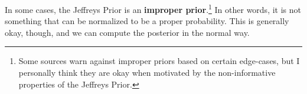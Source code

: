 \documentclass{tufte-handout}
\begin{document}
In some cases, the Jeffreys Prior is an \textbf{improper prior}.\footnote{
  Some sources warn against improper priors based on certain edge-cases,
  but I personally think they are okay when motivated by the non-informative
  properties of the Jeffreys Prior.
}
In other
words, it is not something that can be normalized to be a proper probability.
This is generally okay, though, and we can compute the posterior in the 
normal way.
\end{document}
